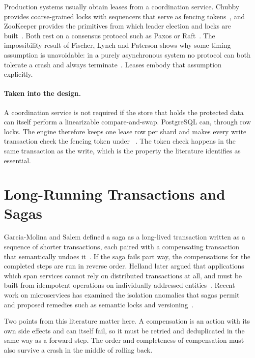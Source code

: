 Production systems usually obtain leases from a coordination service. Chubby
provides coarse-grained locks with sequencers that serve as fencing
tokens~\cite{chubby2006}, and ZooKeeper provides the primitives from which
leader election and locks are built~\cite{zookeeper2010}. Both rest on a
consensus protocol such as Paxos or Raft~\cite{raft2014}. The impossibility
result of Fischer, Lynch and Paterson shows why some timing assumption is
unavoidable: in a purely asynchronous system no protocol can both tolerate a
crash and always terminate~\cite{flp1985}. Leases embody that assumption
explicitly.

\paragraph{Taken into the design.} A coordination service is not required if
the store that holds the protected data can itself perform a linearizable
compare-and-swap. PostgreSQL can, through row locks. The engine therefore
keeps one lease row per shard and makes every write transaction check the
fencing token under ~\cite{postgresdocs}. The token
check happens in the same transaction as the write, which is the property the
literature identifies as essential.

\section{Long-Running Transactions and Sagas}

Garcia-Molina and Salem defined a saga as a long-lived transaction written as
a sequence of shorter transactions, each paired with a compensating
transaction that semantically undoes it~\cite{sagas1987}. If the saga fails
part way, the compensations for the completed steps are run in reverse order.
Helland later argued that applications which span services cannot rely on
distributed transactions at all, and must be built from idempotent operations
on individually addressed entities~\cite{helland2007}. Recent work on
microservices has examined the isolation anomalies that sagas permit and
proposed remedies such as semantic locks and versioning~\cite{daraghmi2022}.

Two points from this literature matter here. A compensation is an action with
its own side effects and can itself fail, so it must be retried and
deduplicated in the same way as a forward step. The order and completeness of
compensation must also survive a crash in the middle of rolling back.

